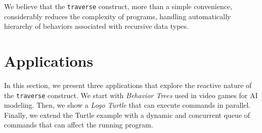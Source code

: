 \documentclass{sig-alternate}
\newcommand{\CEU}{\textsc{C\'{e}u}\xspace}
\newcommand{\code}[1] {{\small{\texttt{#1}}}}
\begin{document}
We believe that the \code{traverse} construct, more than a simple convenience, 
considerably reduces the complexity of programs, handling automatically 
hierarchy of behaviors associated with recursive data types.

\section{Applications}
\label{sec.apps}

In this section, we present three applications that explore the reactive nature 
of the \code{traverse} construct.
We start with \emph{Behavior Trees} used in video games for AI modeling.
Then, we show a \emph{Logo Turtle} that can execute commands in parallel.
Finally, we extend the Turtle example with a dynamic and concurrent queue of 
commands that can affect the running program.
\end{document}

